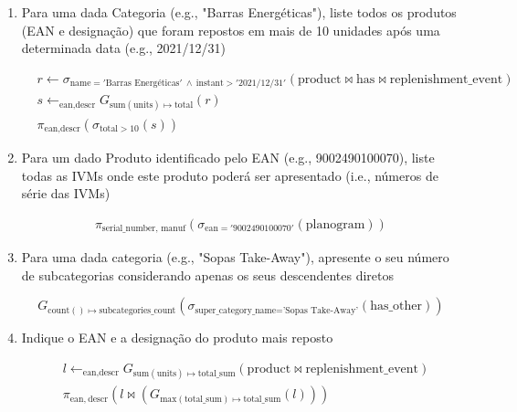 \documentclass[12pt,a4paper]{article}
\newcommand{\op}{\text}
\begin{document}
  \begin{enumerate}
    \item Para uma dada Categoria (e.g., "Barras Energéticas"), liste todos os produtos (EAN e designação) que foram repostos em mais de 10 unidades após uma determinada data (e.g., 2021/12/31)

    \[
      \begin{aligned}
        &r \leftarrow \sigma_{\op{name}='\text{Barras Energéticas}'~\land~\op{instant} > '\text{2021/12/31}'}(\op{product} \bowtie \op{has} \bowtie \op{replenishment\_event})\\
        &s \leftarrow _{\op{ean}, \op{descr}} G_{\op{sum}(\op{units}) \mapsto \op{total}}(r)\\
        &\pi_{\op{ean}, \op{descr}} \left(\sigma_{\op{total} > 10}\left(s\right)\right)
      \end{aligned}
    \]

    \item Para um dado Produto identificado pelo EAN (e.g., 9002490100070), liste todas as IVMs onde este produto poderá ser apresentado (i.e., números de série das IVMs)

    \[
      \begin{aligned}
        \pi_{\op{serial\_number, manuf}}\left(\sigma_{\op{ean}='9002490100070'}\left(\op{planogram}\right)\right)
      \end{aligned}
    \]

    \item Para uma dada categoria (e.g., "Sopas Take-Away"), apresente o seu número de subcategorias considerando apenas os seus descendentes diretos

    \[
      G_{\op{count}()\mapsto \op{subcategories\_count}}\left(\sigma_{\op{super\_category\_name}=\text{'Sopas Take-Away'}}(\op{has\_other})\right)
    \]

    \item Indique o EAN e a designação do produto mais reposto

    \[
      \begin{aligned}
        &l \leftarrow _{\op{ean,descr}} G_{\op{sum}(\op{units})\mapsto \op{total\_sum}}(\op{product} \bowtie \op{replenishment\_event})\\
        &\pi_{\op{ean},~\op{descr}}\left(
          l \bowtie \left( G_{\op{max}(\op{total\_sum})\mapsto \op{total\_sum}}(l)\right)
        \right)
        \end{aligned}
    \]
  \end{enumerate}
  
\end{document}
